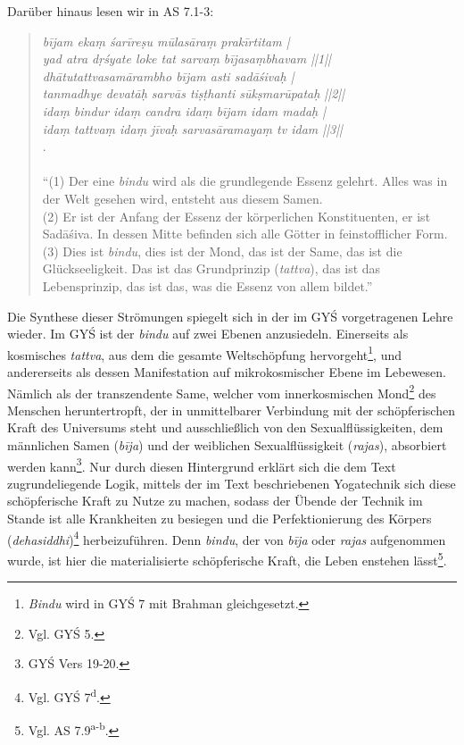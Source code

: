 \documentclass[a4paper,12pt]{article}
\begin{document}
{Darüber hinaus lesen wir in AS 7.1-3:

  \begin{quote}\textit{bījam ekaṃ śarīreṣu mūlasāraṃ prakīrtitam |\\
      yad atra dṛśyate loke tat sarvaṃ bījasaṃbhavam ||1||\\
      dhātutattvasamārambho bījam asti sadāśivaḥ |\\
      tanmadhye devatāḥ sarvās tiṣṭhanti sūkṣmarūpataḥ ||2||\\
      idaṃ bindur idaṃ candra idaṃ bījam idam madaḥ |\\
      idaṃ tattvaṃ idaṃ jīvaḥ sarvasāramayaṃ tv idam ||3||}\\
    \parencite[9]{asiddhi}.\\ \\
    ``(1) Der eine \textit{bindu} wird als die grundlegende Essenz gelehrt. Alles was in der Welt gesehen wird, entsteht aus diesem Samen.\\ (2) Er ist der Anfang der Essenz der körperlichen Konstituenten, er ist Sadāśiva. In dessen Mitte befinden sich alle Götter in feinstofflicher Form.\\ (3) Dies ist \textit{bindu}, dies ist der Mond, das ist der Same, das ist die Glückseeligkeit. Das ist das Grundprinzip (\textit{tattva}), das ist das Lebensprinzip, das ist das, was die Essenz von allem bildet.''\end{quote}

    Die Synthese dieser Strömungen spiegelt sich in der im GYŚ vorgetragenen Lehre wieder. Im GYŚ ist der \textit{bindu} auf zwei Ebenen anzusiedeln. Einerseits als kosmisches \textit{tattva}, aus dem die gesamte Weltschöpfung hervorgeht\footnote{\textit{Bindu} wird in GYŚ 7 mit Brahman gleichgesetzt.}, und andererseits als dessen Manifestation auf mikrokosmischer Ebene im Lebewesen. Nämlich als der transzendente Same, welcher vom innerkosmischen Mond\footnote{Vgl. GYŚ 5.} des Menschen heruntertropft, der in unmittelbarer Verbindung mit der schöpferischen Kraft des Universums steht und ausschließlich von den Sexualflüssigkeiten, dem männlichen Samen (\textit{bīja}) und der weiblichen Sexualflüssigkeit (\textit{rajas}), absorbiert werden kann\footnote{GYŚ Vers 19-20.}. Nur durch diesen Hintergrund erklärt sich die dem Text zugrundeliegende Logik, mittels der im Text beschriebenen Yogatechnik sich diese schöpferische Kraft zu Nutze zu machen, sodass der Übende der Technik im Stande ist alle Krankheiten zu besiegen und die Perfektionierung des Körpers (\textit{dehasiddhi})\footnote{Vgl. GYŚ 7\textsuperscript{d}.} herbeizuführen. Denn \textit{bindu}, der von \textit{bīja} oder \textit{rajas} aufgenommen wurde, ist hier die materialisierte schöpferische Kraft, die Leben enstehen lässt\footnote{Vgl. AS 7.9\textsuperscript{a-b}.}.

}
\end{document}
